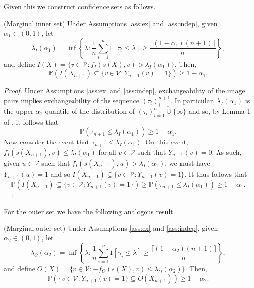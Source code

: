 Given this we construct confidence sets as follows.
\begin{theorem}\label{thm:inner}
	(Marginal inner set)
	Under Assumptions \ref{ass:ex} and \ref{ass:indep}, given $\alpha_1 \in (0,1)$, let 
	\begin{equation}\label{lambdaI}
		\lambda_I(\alpha_1) = \inf\left\lbrace \lambda: \frac{1}{n} \sum_{i = 1}^n 1\left[ \tau_i\leq \lambda \right] \geq \frac{\lceil (1-\alpha_1)(n+1) \rceil}{n}\right\rbrace,
	\end{equation}
	and define $I(X) = \lbrace v \in \mathcal{V}: f_I(s(X), v) >\lambda_I(\alpha_1)  \rbrace $. Then,
	\begin{equation}\label{eq:probstat}
		\mathbb{P}\left( I(X_{n+1}) \subseteq\lbrace v\in \mathcal{V}: Y_{n+1}(v) = 1 \rbrace \right) \geq 1 - \alpha_1.
	\end{equation}
\end{theorem}
\begin{proof}
	Under Assumptions \ref{ass:ex} and \ref{ass:indep}, exchangeability of the image pairs implies exchangeability of the sequence $(\tau_i)_{i = 1}^{n+1}$. In particular, $\lambda_I(\alpha_1)$ is the upper $\alpha_1$ quantile of the distribution of $(\tau_i)_{i = 1}^{n} \cup \lbrace \infty \rbrace $ and so, by Lemma 1 of \cite{Tibshirani2019}, it follows that 
	\begin{equation*}
	\mathbb{P}\left(\tau_{n+1} \leq \lambda_I(\alpha_1) \right) \geq 1 - \alpha_1. 
	\end{equation*}
	Now consider the event that $\tau_{n+1}\leq \lambda_I(\alpha_1)$. On this event, $ f_I(s(X_{n+1}),v) \leq \lambda_I(\alpha_1) $
	for all $v \in \mathcal{V}$ such that $Y_{n+1}(v) = 0$. As such, given $u \in \mathcal{V}$ such that $ f_I(s(X_{n+1}), u) > \lambda_I(\alpha_1) $, we must have $Y_{n+1}(u) = 1$ and so $I(X_{n+1}) \subseteq \lbrace v\in \mathcal{V}: Y_{n+1}(v) = 1 \rbrace  $. It thus follows that
	\begin{equation*}
	\mathbb{P}\left( I(X_{n+1}) \subseteq \lbrace v\in \mathcal{V}: Y_{n+1}(v) = 1 \rbrace  \right) \geq \mathbb{P}\left(\tau_{n+1} \leq \lambda_I(\alpha_1) \right) \geq 1 - \alpha_1. 
\end{equation*}
\end{proof}
\noindent For the outer set we have the following analogous result.
\begin{theorem}\label{thm:outer}
	(Marginal outer set)
	Under Assumptions \ref{ass:ex} and \ref{ass:indep}, given $\alpha_2 \in (0,1)$, let 
	\begin{equation}\label{lambdaO}
		\lambda_O({\alpha_2})= \inf\left\lbrace \lambda: \frac{1}{n} \sum_{i = 1}^n 1\left[ \gamma_i\leq \lambda \right] \geq \frac{\lceil (1-\alpha_2)(n+1) \rceil}{n} \right\rbrace,
	\end{equation}
	and define $O(X) = \lbrace v \in \mathcal{V}: -f_O(s(X), v) \leq \lambda_O(\alpha_2)  \rbrace $. Then,
	\begin{equation}\label{eq:probstat}
		\mathbb{P}\left( \lbrace v\in \mathcal{V}: Y_{n+1}(v) = 1 \rbrace \subseteq O(X_{n+1}) \right) \geq 1 - \alpha_2.
	\end{equation}
\end{theorem}
